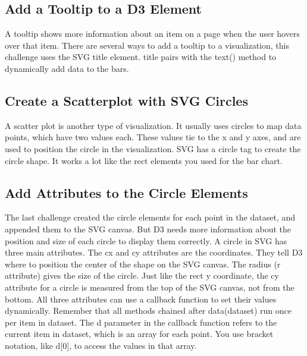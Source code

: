 \documentclass{article}%
\begin{document}
%
\subsection{Add a Tooltip to a D3 Element}%
\label{subsec:AddaTooltiptoaD3Element}%
A tooltip shows more information about an item on a page when the user hovers over that item. There are several ways to add a tooltip to a visualization, this challenge uses the SVG title element.\newline%
title pairs with the text() method to dynamically add data to the bars.\newline%

%
\subsection{Create a Scatterplot with SVG Circles}%
\label{subsec:CreateaScatterplotwithSVGCircles}%
A scatter plot is another type of visualization. It usually uses circles to map data points, which have two values each. These values tie to the x and y axes, and are used to position the circle in the visualization.\newline%
SVG has a circle tag to create the circle shape. It works a lot like the rect elements you used for the bar chart.\newline%

%
\subsection{Add Attributes to the Circle Elements}%
\label{subsec:AddAttributestotheCircleElements}%
The last challenge created the circle elements for each point in the dataset, and appended them to the SVG canvas. But D3 needs more information about the position and size of each circle to display them correctly.\newline%
A circle in SVG has three main attributes. The cx and cy attributes are the coordinates. They tell D3 where to position the center of the shape on the SVG canvas. The radius (r attribute) gives the size of the circle.\newline%
Just like the rect y coordinate, the cy attribute for a circle is measured from the top of the SVG canvas, not from the bottom.\newline%
All three attributes can use a callback function to set their values dynamically. Remember that all methods chained after data(dataset) run once per item in dataset. The d parameter in the callback function refers to the current item in dataset, which is an array for each point. You use bracket notation, like d{[}0{]}, to access the values in that array.\newline%
\end{document}
